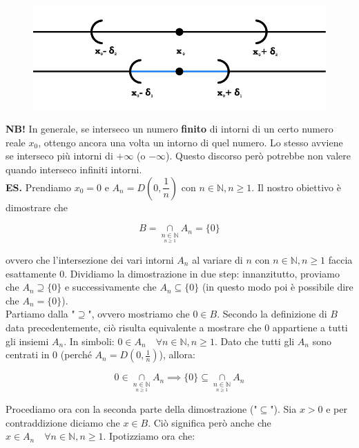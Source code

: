 \documentclass{article}
\begin{document}
\begin{figure}[!h]
    \centering
    \includegraphics[width=12cm]{./images/interval2.pdf}
\end{figure}

\noindent\textbf{NB!} In generale, se interseco un numero \textbf{finito} di intorni di un certo numero reale $x_0$, ottengo ancora una volta un intorno di quel numero. Lo stesso avviene se interseco più intorni di $+\infty$ (o $-\infty$). Questo discorso però potrebbe non valere quando interseco infiniti intorni.\\

\noindent\textbf{ES.} Prendiamo $x_0 = 0$ e $A_n = D\left(0, \dfrac{1}{n}\right)$ con $n \in \mathbb{N}, n \geq 1$. Il nostro obiettivo è dimostrare che

\begin{equation*}
    B = \underset{\underset{\scriptstyle n \geq 1}{n \in \mathbb{N}}}{\cap} A_n = \{0\}
\end{equation*}

\noindent ovvero che l'intersezione dei vari intorni $A_n$ al variare di $n$ con $n \in \mathbb{N}, n \geq 1$ faccia esattamente $0$. Dividiamo la dimostrazione in due step: innanzitutto, proviamo che $A_n \supseteq \{0\}$ e successivamente che $A_n \subseteq \{0\}$ (in questo modo poi è possibile dire che $A_n = \{0\}$).\\
Partiamo dalla "$\supseteq$", ovvero mostriamo che $0 \in B$. Secondo la definizione di $B$ data precedentemente, ciò risulta equivalente a mostrare che $0$ appartiene a tutti gli insiemi $A_n$. In simboli: $0 \in A_n \quad \forall n \in \mathbb{N}, n \geq 1$. Dato che tutti gli $A_n$ sono centrati in $0$ (perché $A_n = D(0, \frac{1}{n})$), allora:

\begin{equation*}
     0 \in \underset{\underset{\scriptstyle n \geq 1}{n \in \mathbb{N}}}{\cap} A_n \implies \{0\} \subseteq \underset{\underset{\scriptstyle n \geq 1}{n \in \mathbb{N}}}{\cap} A_n
\end{equation*}

\noindent Procediamo ora con la seconda parte della dimostrazione ("$\subseteq$"). Sia $x > 0$ e per contraddizione diciamo che $x \in B$. Ciò significa però anche che $x \in A_n \quad \forall n \in \mathbb{N}, n \geq 1$. Ipotizziamo ora che:
\end{document}
